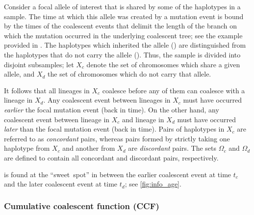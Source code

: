 Consider a focal allele of interest that is shared by some of the haplotypes in a sample.
The time at which this allele was created by a mutation event is bound by the times of the  coalescent events that delimit the length of the branch on which the mutation occurred in the underlying coalescent tree; see the example provided in .
The haplotypes which inherited the allele () are distinguished from the haplotypes that do not carry the allele ().
Thus, the sample is divided into  disjoint subsamples; let $X_c$ denote the set of chromosomes which share a given allele, and $X_d$ the set of chromosomes which do not carry that allele.

%

%

It follows that all lineages in $X_c$ coalesce before any of them can coalesce with a lineage in $X_d$.
Any coalescent event between  lineages in $X_c$ must have occurred \emph{earlier}  the focal mutation event (back in time).
On the other hand, any coalescent event between  lineage in $X_c$ and  lineage in $X_d$ must have occurred \emph{later} than the focal mutation event (back in time).
Pairs of haplotypes in $X_c$ are referred to as \emph{concordant} pairs, whereas pairs formed by strictly taking one haplotype from $X_c$ and another from $X_d$ are \emph{discordant} pairs.
The sets $\Omega_c$ and $\Omega_d$ are defined to contain all concordant and discordant pairs, respectively.

 is found at the ``sweet~spot'' in between the earlier coalescent event at time $t_c$ and the later coalescent event at time $t_d$; see \cref{fig:info_age}.



%
\subsubsection{Cumulative coalescent function (CCF)}\label{sec:ccf_desc}
%

